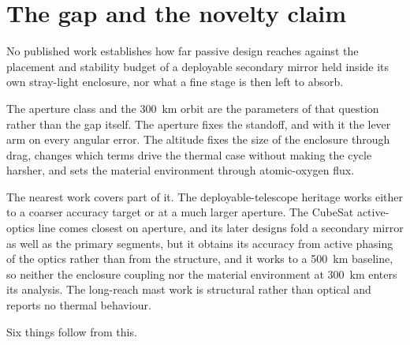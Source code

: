 \section{The gap and the novelty claim}
\label{sec:gap}

No published work establishes how far passive design reaches against the placement and stability budget of a deployable secondary mirror held inside its own stray-light enclosure, nor what a fine stage is then left to absorb.

The aperture class and the \SI{300}{\kilo\meter} orbit are the parameters of that question rather than the gap itself. The aperture fixes the standoff, and with it the lever arm on every angular error. The altitude fixes the size of the enclosure through drag, changes which terms drive the thermal case without making the cycle harsher, and sets the material environment through atomic-oxygen flux.

The nearest work covers part of it. The deployable-telescope heritage works either to a coarser accuracy target or at a much larger aperture. The CubeSat active-optics line \cite{schwartz_laboratory_2018, schwartz_high-resolution_2020, schwartz_active_2021, schwartz_6u_2022, schwartz_high-resolution_2025} comes closest on aperture, and its later designs fold a secondary mirror as well as the primary segments, but it obtains its accuracy from active phasing of the optics rather than from the structure, and it works to a \SI{500}{\kilo\meter} baseline, so neither the enclosure coupling nor the material environment at \SI{300}{\kilo\meter} enters its analysis. The long-reach mast work is structural rather than optical and reports no thermal behaviour.

Six things follow from this.

